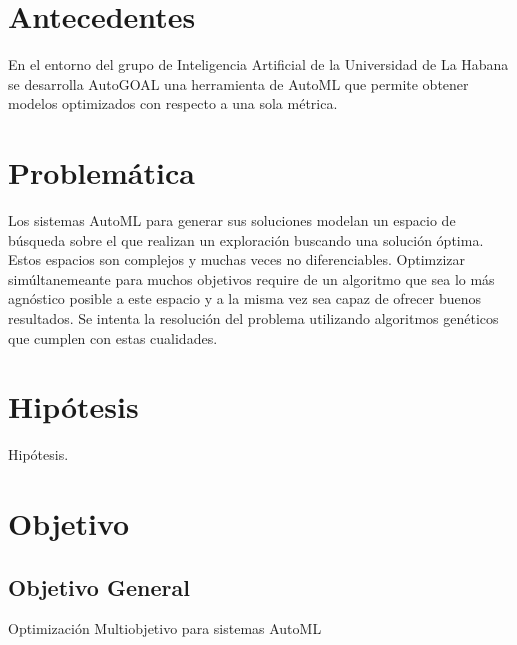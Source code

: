 \section*{Antecedentes}
En el entorno del grupo de Inteligencia Artificial de la Universidad de La Habana se desarrolla AutoGOAL una herramienta de AutoML que permite obtener modelos optimizados con respecto a una sola m\'etrica.

\section*{Problem\'atica}
Los sistemas AutoML para generar sus soluciones modelan un espacio de b\'usqueda sobre el que realizan un exploraci\'on buscando una soluci\'on \'optima.
Estos espacios son complejos y muchas veces no diferenciables.
Optimzizar sim\'ultanemeante para muchos objetivos require de un algoritmo que sea lo m\'as agn\'ostico posible a este espacio y a la misma vez sea capaz de ofrecer buenos resultados.
Se intenta la resoluci\'on del problema utilizando algoritmos gen\'eticos que cumplen con estas cualidades.


\section*{Hip\'otesis}
 Hip\'otesis.

 
\section*{Objetivo}
\subsection*{Objetivo General}
Optimizaci\'on Multiobjetivo para sistemas AutoML
